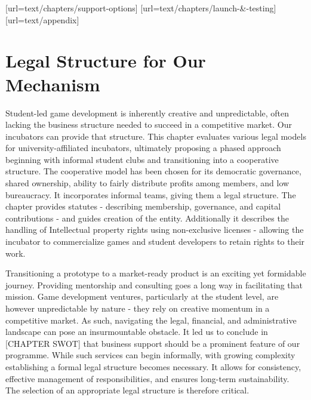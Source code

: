 [url=text/chapters/support-options]
[url=text/chapters/launch-&-testing]
[url=text/appendix]
\chapter{Legal Structure for Our Mechanism}

\begin{chapterabstract}	
    Student-led game development is inherently creative and unpredictable, often lacking the business structure needed to succeed in a competitive market. Our incubators can provide that structure. This chapter evaluates various legal models for university-affiliated incubators, ultimately proposing a phased approach beginning with informal student clubs and transitioning into a cooperative structure. The cooperative model has been chosen for its democratic governance, shared ownership, ability to fairly distribute profits among members, and low bureaucracy. It incorporates informal teams, giving them a legal structure. The chapter provides statutes - describing membership, governance, and capital contributions - and guides creation of the entity. Additionally it describes the handling of Intellectual property rights using non-exclusive licenses - allowing the incubator to commercialize games and student developers to retain rights to their work.
\end{chapterabstract}

Transitioning a prototype to a market-ready product is an exciting yet formidable journey. Providing mentorship and consulting goes a long way in facilitating that mission. Game development ventures, particularly at the student level, are however unpredictable by nature - they rely on creative momentum in a competitive market. As such, navigating the legal, financial, and administrative landscape can pose an insurmountable obstacle. It led us to conclude in [CHAPTER SWOT] that business support should be a prominent feature of our programme. While such services can begin informally, with growing complexity establishing a formal legal structure becomes necessary. It allows for consistency, effective management of responsibilities, and ensures long-term sustainability. The selection of an appropriate legal structure is therefore critical.

